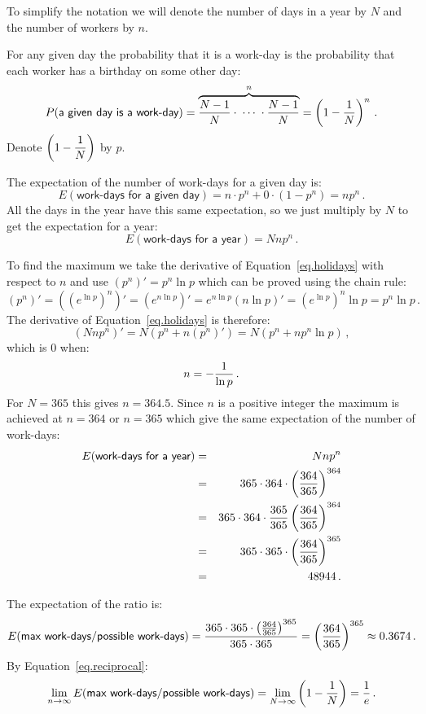To simplify the notation we will denote the number of days in a year by $N$ and the number of workers by $n$.

For any given day the probability that it is a work-day is the probability that each worker has a birthday on some other day:
\[
P(\textsf{a given day is a work-day})=\overbrace{\displaystyle\frac{N-1}{N} \cdot \;\cdots\;\cdot \displaystyle\frac{N-1}{N}}^n = \left(1-\displaystyle\frac{1}{N}\right)^n\,.
\]
Denote $\left(1-\displaystyle\frac{1}{N}\right)$ by $p$.

The expectation of the number of work-days for a given day is:
\[
E(\textsf{work-days for a given day}) = n \cdot p^n + 0\cdot (1-p^n) = np^n\,.
\]
All the days in the year have this same expectation, so we just multiply by $N$ to get the expectation for a year:
\begin{equation}\label{eq.holidays}
E(\textsf{work-days for a year}) = Nnp^n\,.
\end{equation}

To find the maximum we take the derivative of Equation~\ref{eq.holidays} with respect to $n$ and use
$(p^n)'=p^n\ln p$ which can be proved using the chain rule:
\[
(p^n)' = ((e^{\ln p})^n)' =
(e^{n\ln p})' =
e^{n\ln p} (n\ln p)'=
(e^{\ln p})^n \ln p = p^n\ln p\,.
\]
The derivative of Equation~\ref{eq.holidays} is therefore:
\[
(Nnp^n)'= N (p^n + n (p^n)') = N (p^n + np^n\ln p)\,,
\]
which is $0$ when:
\[
n=-\displaystyle\frac{1}{\ln p}\,.
\]
For $N=365$ this gives $n=364.5$. Since $n$ is a positive integer the maximum is achieved at $n=364$ or $n=365$ which give the same expectation of the number of work-days:
\begin{eqnarray*}
E(\textsf{work-days for a year}) &=&Nnp^n\\
&=&365\cdot 364 \cdot \left(\displaystyle\frac{364}{365}\right)^{364}\\
&=&365\cdot 364  \cdot \displaystyle\frac{365}{365}\left(\displaystyle\frac{364}{365}\right)^{364}\\
&=&365\cdot 365  \cdot \left(\displaystyle\frac{364}{365}\right)^{365}\\
&=&48944\,.
\end{eqnarray*}

The expectation of the ratio is:
\[
E(\textsf{max work-days/possible work-days})=\displaystyle\frac{365\cdot 365  \cdot \left(\frac{364}{365}\right)^{365}}{365\cdot 365}=\left(\displaystyle\frac{364}{365}\right)^{365}\approx 0.3674\,.
\]
By Equation~\ref{eq.reciprocal}:
\[
\lim_{n\rightarrow\infty}E(\textsf{max work-days/possible work-days})=\lim_{N\rightarrow \infty} \left(1-\displaystyle\frac{1}{N}\right)= \displaystyle\frac{1}{e}\,.
\]

